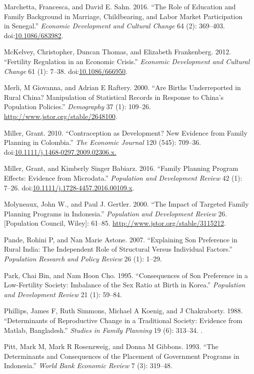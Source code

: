 \documentclass[]{article}
\begin{document}
Marchetta, Francesca, and David E. Sahn. 2016. ``The Role of Education and Family Background in Marriage, Childbearing, and Labor Market Participation in Senegal.'' \emph{Economic Development and Cultural Change} 64 (2): 369--403. doi:\href{https://doi.org/10.1086/683982}{10.1086/683982}.

McKelvey, Christopher, Duncan Thomas, and Elizabeth Frankenberg. 2012. ``Fertility Regulation in an Economic Crisis.'' \emph{Economic Development and Cultural Change} 61 (1): 7--38. doi:\href{https://doi.org/10.1086/666950}{10.1086/666950}.

Merli, M Giovanna, and Adrian E Raftery. 2000. ``Are Births Underreported in Rural China? Manipulation of Statistical Records in Response to China's Population Policies.'' \emph{Demography} 37 (1): 109--26. \url{http://www.jstor.org/stable/2648100}.

Miller, Grant. 2010. ``Contraception as Development? New Evidence from Family Planning in Colombia.'' \emph{The Economic Journal} 120 (545): 709--36. doi:\href{https://doi.org/10.1111/j.1468-0297.2009.02306.x.}{10.1111/j.1468-0297.2009.02306.x.}

Miller, Grant, and Kimberly Singer Babiarz. 2016. ``Family Planning Program Effects: Evidence from Microdata.'' \emph{Population and Development Review} 42 (1): 7--26. doi:\href{https://doi.org/10.1111/j.1728-4457.2016.00109.x}{10.1111/j.1728-4457.2016.00109.x}.

Molyneaux, John W., and Paul J. Gertler. 2000. ``The Impact of Targeted Family Planning Programs in Indonesia.'' \emph{Population and Development Review} 26. {[}Population Council, Wiley{]}: 61--85. \url{http://www.jstor.org/stable/3115212}.

Pande, Rohini P, and Nan Marie Astone. 2007. ``Explaining Son Preference in Rural India: The Independent Role of Structural Versus Individual Factors.'' \emph{Population Research and Policy Review} 26 (1): 1--29.

Park, Chai Bin, and Nam Hoon Cho. 1995. ``Consequences of Son Preference in a Low-Fertility Society: Imbalance of the Sex Ratio at Birth in Korea.'' \emph{Population and Development Review} 21 (1): 59--84.

Phillips, James F, Ruth Simmons, Michael A Koenig, and J Chakraborty. 1988. ``Determinants of Reproductive Change in a Traditional Society: Evidence from Matlab, Bangladesh.'' \emph{Studies in Family Planning} 19 (6): 313--34. .

Pitt, Mark M, Mark R Rosenzweig, and Donna M Gibbons. 1993. ``The Determinants and Consequences of the Placement of Government Programs in Indonesia.'' \emph{World Bank Economic Review} 7 (3): 319--48.
\end{document}
